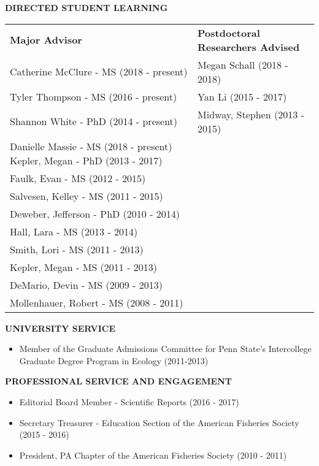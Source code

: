 \documentclass[10pt]{article}
\begin{document}
\begin{flushleft}
\begin{itemize}
\end{itemize}

\vspace{8pt}


\centerline {\bf{DIRECTED STUDENT LEARNING}}
\vspace{5pt}
\begin{tabularx}{\textwidth}{ XX }

\textbf{Major Advisor} & \textbf{Postdoctoral Researchers Advised} \\

Catherine McClure - MS (2018 - present) & Megan Schall (2018 - 2018) \\
Tyler Thompson - MS (2016 - present) & Yan Li (2015 - 2017)\\
Shannon White - PhD (2014 - present)  & Midway, Stephen (2013 - 2015)\\
Danielle Massie - MS (2018 - present)
Kepler, Megan - PhD (2013 - 2017) & \\
Faulk, Evan - MS (2012 - 2015) &  \\
Salvesen, Kelley - MS (2011 - 2015) & \\
Deweber, Jefferson - PhD (2010 - 2014) & \\
Hall, Lara - MS (2013 - 2014) & \\
Smith, Lori - MS (2011 - 2013) & \\
Kepler, Megan - MS (2011 - 2013) & \\
DeMario, Devin - MS (2009 - 2013) & \\
Mollenhauer, Robert - MS (2008 - 2011) & \\
\end{tabularx}



\end{flushleft}

\centerline {\bf{UNIVERSITY SERVICE}}
\vspace{5pt}
\begin{itemize}
\item Member of the Graduate Admissions Committee for Penn State's Intercollege Graduate Degree Program in Ecology (2011-2013) 
\end{itemize}

\centerline {\bf{PROFESSIONAL SERVICE AND ENGAGEMENT}}
\vspace{5pt}
\begin{itemize}
\item Editorial Board Member - Scientific Reports (2016 - 2017)
\item Secretary Treasurer - Education Section of the American Fisheries Society (2015 - 2016)
\item President, PA Chapter of the American Fisheries Society (2010 - 2011)
\end{itemize}
\end{document}
